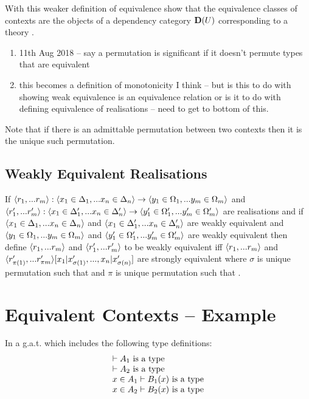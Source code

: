 \documentclass[10pt,a4paper]{scrartcl}
\begin{document}
With this weaker definition of equivalence   show that the 
equivalence classes of contexts are the objects of a dependency category
$\mathbf{D}(U)$ corresponding to a theory \gat. \\
\begin{framed}
\begin{enumerate}
\item 11th Aug 2018 -- say a permutation is significant if it doesn't permute types that are equivalent
\item this becomes a definition of monotonicity I think -- but is this to do with showing weak equivalence 
is an equivalence relation or is it to do with defining equivalence of realisations -- need to get to bottom of this.
\end{enumerate}
\end{framed}
\noindent
Note that if there is an admittable  permutation between two contexts then it is the unique such permutation. 

\subsection{Weakly Equivalent Realisations}
If $\langle r_1,...r_m\rangle: \langle x_1 \in \Delta_1,... x_{n} \in \Delta_{n}\rangle \rightarrow \langle y_1 \in \Omega_1,... y_{m} \in \Omega_{m}\rangle$ and
$\langle r'_1,...r'_m\rangle: \langle x_1 \in \Delta'_1,... x_{n} \in \Delta'_{n}\rangle \rightarrow \langle y'_1 \in \Omega'_1,... y'_{m} \in \Omega'_{m}\rangle$ are realisations 
and if $\langle x_1 \in \Delta_1,... x_{n} \in \Delta_{n}\rangle$ and 
$\langle x_1 \in \Delta'_1,... x_{n} \in \Delta'_{n}\rangle$ are weakly equivalent and 
$\langle y_1 \in \Omega_1,... y_{m} \in \Omega_{m}\rangle$ and $\langle y'_1 \in \Omega'_1,... y'_{m} \in \Omega'_{m}\rangle$ are weakly equivalent then
define $\langle r_1,...r_m\rangle$ and $\langle r'_1,...r'_m\rangle$ to be weakly equivalent 
iff 
$\langle r_1,...r_m\rangle$
and
$\langle r'_{\pi(1)},...r'_{\pi{m}}\rangle[x_1|x'_{\sigma(1)},...,x_n|x'_{\sigma(n)}]$
are strongly equivalent
where
$\sigma$ is unique permutation such that 
and $\pi$ is unique permutation such that .


\section{Equivalent Contexts -- Example}

In a g.a.t. \gat which includes the following type definitions:
\begin{displaymath}
\begin{array}{l}
\vdash A_1\mbox{ is a type} \\
\vdash A_2\mbox{ is a type} \\
x \in A_1\vdash B_1(x)\mbox{ is a type} \\
x \in A_2\vdash B_2(x)\mbox{ is a type} \\
\end{array}
\end{displaymath}
\end{document}
